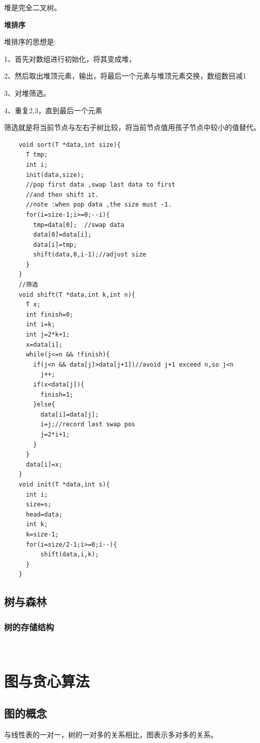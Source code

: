 \documentclass{article}
\begin{document}
		堆是完全二叉树。

		\textbf{堆排序}
		
		堆排序的思想是:

		1、首先对数组进行初始化，将其变成堆，
		
		2、然后取出堆顶元素，输出，将最后一个元素与堆顶元素交换，数组数目减1
		
		3、对堆筛选。

		4、重复2,3，直到最后一个元素

		筛选就是将当前节点与左右子树比较，将当前节点值用孩子节点中较小的值替代。

		\begin{verbatim}
    void sort(T *data,int size){
      T tmp;
      int i;
      init(data,size);
      //pop first data ,swap last data to first 
      //and then shift it.
      //note :when pop data ,the size must -1.
      for(i=size-1;i>=0;--i){
        tmp=data[0];  //swap data 
        data[0]=data[i];
        data[i]=tmp;
        shift(data,0,i-1);//adjust size
      }
    }
    //筛选
    void shift(T *data,int k,int n){
      T x;
      int finish=0;
      int i=k;
      int j=2*k+1;
      x=data[i];
      while(j<=n && !finish){
        if(j<n && data[j]>data[j+1])//avoid j+1 exceed n,so j<n
          j++;
        if(x<data[j]){
          finish=1;
        }else{
          data[i]=data[j];
          i=j;//record last swap pos
          j=2*i+1;
        }
      }
      data[i]=x;
    }
    void init(T *data,int s){
      int i;
      size=s;
      head=data;
      int k;
      k=size-1;
      for(i=size/2-1;i>=0;i--){
          shift(data,i,k);
      }
    }
		\end{verbatim}

	\subsection{树与森林}
	\subsubsection{树的存储结构}



	\	
\section{图与贪心算法}
	\subsection{图的概念}
		与线性表的一对一，树的一对多的关系相比，图表示多对多的关系。
\end{document}
